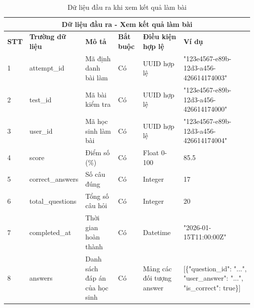 \documentclass[../DoAn.tex]{subfiles}
\begin{document}
\begin{table}[h!]
\centering
\begin{tabular}{|m{1cm}|m{2.5cm}|m{3cm}|m{1cm}|m{2.5cm}|m{3.5cm}|}
    \hline
    \multicolumn{6}{|c|}{\textbf{Dữ liệu đầu ra - Xem kết quả làm bài}} \\
    \hline
    \textbf{STT} & \textbf{Trường dữ liệu} & \textbf{Mô tả} & \textbf{Bắt buộc} & \textbf{Điều kiện hợp lệ} & \textbf{Ví dụ} \\
    \hline
    1 & attempt\_id & Mã định danh bài làm & Có & UUID hợp lệ & "123e4567-e89b-12d3-a456-426614174003" \\
    \hline
    2 & test\_id & Mã bài kiểm tra & Có & UUID hợp lệ & "123e4567-e89b-12d3-a456-426614174000" \\
    \hline
    3 & user\_id & Mã học sinh làm bài & Có & UUID hợp lệ & "123e4567-e89b-12d3-a456-426614174004" \\
    \hline
    4 & score & Điểm số (\%) & Có & Float 0-100 & 85.5 \\
    \hline
    5 & correct\_answers & Số câu đúng & Có & Integer & 17 \\
    \hline
    6 & total\_questions & Tổng số câu hỏi & Có & Integer & 20 \\
    \hline
    7 & completed\_at & Thời gian hoàn thành & Có & Datetime & "2026-01-15T11:00:00Z" \\
    \hline
    8 & answers & Danh sách đáp án của học sinh & Có & Mảng các đối tượng answer & [\{"question\_id": "...", "user\_answer": "...", "is\_correct": true\}] \\
    \hline
\end{tabular}
\caption{Dữ liệu đầu ra khi xem kết quả làm bài}
\end{table}

\vspace{0.5cm}
\end{document}
